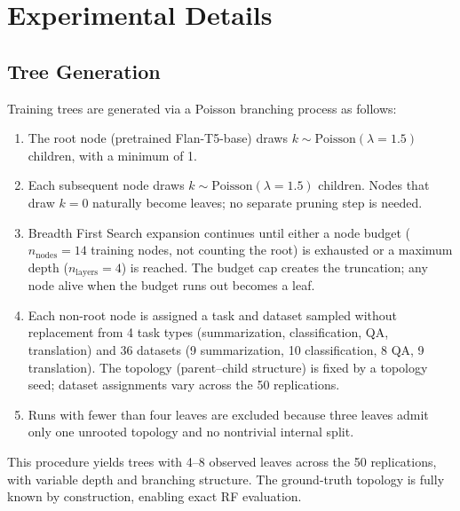 \documentclass{article}
\theoremstyle{definition}
\theoremstyle{plain}
\begin{document}




\appendix

\section{Experimental Details}
\label{app:details}

\subsection*{Tree Generation}
\label{app:tree-gen}

Training trees are generated via a Poisson branching process as follows:

\begin{enumerate}
    \item The root node (pretrained Flan-T5-base) draws $k \sim \mathrm{Poisson}(\lambda = 1.5)$ children, with a minimum of 1.
    \item Each subsequent node draws $k \sim \mathrm{Poisson}(\lambda = 1.5)$ children. Nodes that draw $k = 0$ naturally become leaves; no separate pruning step is needed.
    \item Breadth First Search expansion continues until either a node budget ($n_\mathrm{nodes} = 14$ training nodes, not counting the root) is exhausted or a maximum depth ($n_\mathrm{layers} = 4$) is reached. The budget cap creates the truncation; any node alive when the budget runs out becomes a leaf.
    \item Each non-root node is assigned a task and dataset sampled without replacement from 4 task types (summarization, classification, QA, translation) and 36 datasets (9 summarization, 10 classification, 8 QA, 9 translation). The topology (parent--child structure) is fixed by a topology seed; dataset assignments vary across the 50 replications.
    \item Runs with fewer than four leaves are excluded because three leaves admit only one unrooted topology and no nontrivial internal split.
\end{enumerate}

This procedure yields trees with 4--8 observed leaves across the 50 replications, with variable depth and branching structure. The ground-truth topology is fully known by construction, enabling exact RF evaluation.
\end{document}
